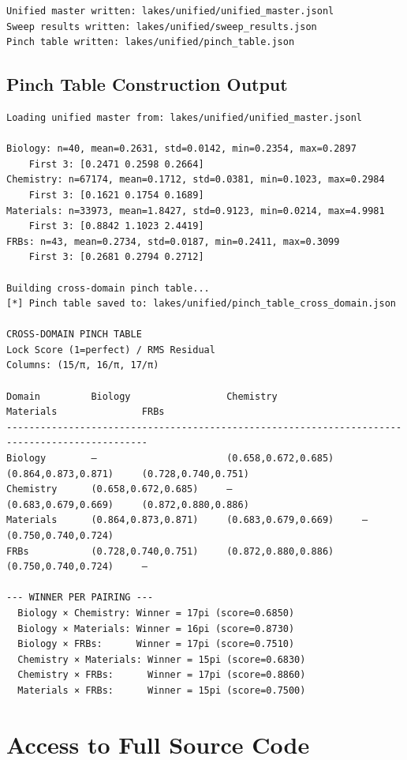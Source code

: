 \documentclass[11pt, letterpaper, openany]{book}
\begin{document}
\begin{lstlisting}[style=terminal]
Unified master written: lakes/unified/unified_master.jsonl
Sweep results written: lakes/unified/sweep_results.json
Pinch table written: lakes/unified/pinch_table.json
\end{lstlisting}

\subsection{Pinch Table Construction Output}

\begin{lstlisting}[style=terminal]
Loading unified master from: lakes/unified/unified_master.jsonl

Biology: n=40, mean=0.2631, std=0.0142, min=0.2354, max=0.2897
    First 3: [0.2471 0.2598 0.2664]
Chemistry: n=67174, mean=0.1712, std=0.0381, min=0.1023, max=0.2984
    First 3: [0.1621 0.1754 0.1689]
Materials: n=33973, mean=1.8427, std=0.9123, min=0.0214, max=4.9981
    First 3: [0.8842 1.1023 2.4419]
FRBs: n=43, mean=0.2734, std=0.0187, min=0.2411, max=0.3099
    First 3: [0.2681 0.2794 0.2712]

Building cross-domain pinch table...
[*] Pinch table saved to: lakes/unified/pinch_table_cross_domain.json

CROSS-DOMAIN PINCH TABLE
Lock Score (1=perfect) / RMS Residual
Columns: (15/π, 16/π, 17/π)

Domain         Biology                 Chemistry               Materials               FRBs
-----------------------------------------------------------------------------------------------
Biology        —                       (0.658,0.672,0.685)     (0.864,0.873,0.871)     (0.728,0.740,0.751)
Chemistry      (0.658,0.672,0.685)     —                       (0.683,0.679,0.669)     (0.872,0.880,0.886)
Materials      (0.864,0.873,0.871)     (0.683,0.679,0.669)     —                       (0.750,0.740,0.724)
FRBs           (0.728,0.740,0.751)     (0.872,0.880,0.886)     (0.750,0.740,0.724)     —

--- WINNER PER PAIRING ---
  Biology × Chemistry: Winner = 17pi (score=0.6850)
  Biology × Materials: Winner = 16pi (score=0.8730)
  Biology × FRBs:      Winner = 17pi (score=0.7510)
  Chemistry × Materials: Winner = 15pi (score=0.6830)
  Chemistry × FRBs:      Winner = 17pi (score=0.8860)
  Materials × FRBs:      Winner = 15pi (score=0.7500)
\end{lstlisting}


\section{Access to Full Source Code}
\end{document}
